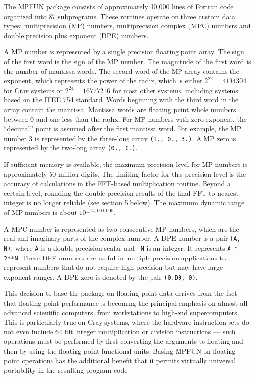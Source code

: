 The MPFUN package consists of approximately 10,000 lines of Fortran
code organized into 87 subprograms.  These routines operate on three
custom data types: multiprecision (MP) numbers, multiprecision complex
(MPC) numbers and double precision plus exponent (DPE) numbers.

A MP number is represented by a single precision floating point array.
The sign of the first word is the sign of the MP number.  The
magnitude of the first word is the number of mantissa words.  The
second word of the MP array contains the exponent, which represents
the power of the radix, which is either $2^{22} = 4194304$ for Cray
systems or $2^{24} = 16777216$ for most other systems, including
systems based on the IEEE 754 standard.  Words beginning with the
third word in the array contain the mantissa.  Mantissa words are
floating point whole numbers between 0 and one less than the radix.
For MP numbers with zero exponent, the ``decimal'' point is assumed
after the first mantissa word.  For example, the MP number 3 is
represented by the three-long array {\tt (1., 0., 3.)}.  A MP zero is
represented by the two-long array {\tt (0., 0.)}.

If sufficient memory is available, the maximum precision level for MP
numbers is approximately 50 million digits.  The limiting factor for
this precision level is the accuracy of calculations in the FFT-based
multiplication routine.  Beyond a certain level, rounding the double
precision results of the final FFT to nearest integer is no longer
reliable (see section 5 below).  The maximum dynamic range of MP
numbers is about $10 ^ {\pm 14,000,000}$.

A MPC number is represented as two consecutive MP numbers, which are
the real and imaginary parts of the complex number.  A DPE number is a
pair {\tt (A, N)}, where {\tt A} is a double precision scalar and {\tt
N} is an integer.  It represents {\tt A * 2**N}.  These DPE numbers
are useful in multiple precision applications to represent numbers
that do not require high precision but may have large exponent ranges.
A DPE zero is denoted by the pair {\tt (0.D0, 0)}.

This decision to base the package on floating point data derives from
the fact that floating point performance is becoming the principal
emphasis on almost all advanced scientific computers, from
workstations to high-end supercomputers.  This is particularly true on
Cray systems, where the hardware instruction sets do not even include
64 bit integer multiplication or division instructions --- such
operations must be performed by first converting the arguments to
floating and then by using the floating point functional units.
Basing MPFUN on floating point operations has the additional benefit
that it permits virtually universal portability in the resulting
program code.

